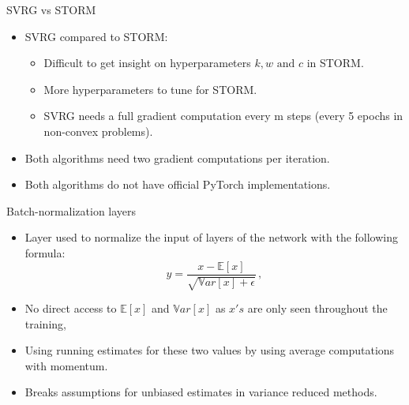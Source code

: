 \documentclass[10pt]{beamer}
\newcommand\pro{\item[\textbf{+}]}
\newcommand\con{\item[\textbf{--\kern 1.2pt}]}
\begin{document}
\begin{frame}{SVRG vs STORM}
    \begin{itemize}
        \item SVRG compared to STORM:
            \begin{itemize}
                \pro Difficult to get insight on hyperparameters $k,w \text{ and } c$ in STORM.
                \pro More hyperparameters to tune for STORM.
                \con SVRG needs a full gradient computation every m steps (every 5 epochs in non-convex problems).
            \end{itemize}
        \item Both algorithms need two gradient computations per iteration.
        \item Both algorithms do not have official PyTorch implementations.
    \end{itemize}
\end{frame}

\begin{frame}{Batch-normalization layers~\citep{ioffe2015batch}}
    \begin{itemize}
        \item Layer used to normalize the input of layers of the network with the following formula:
        \begin{equation}\label{eq:BN}\nonumber
            y = \frac{x-\mathbb{E}[x]}{\sqrt{\mathbb{V}ar[x]+\epsilon}}\,,
        \end{equation}
        \item No direct access to $\mathbb{E}[x]$ and $\mathbb{V}ar[x]$ as $x's$ are only seen throughout the training,
        \item Using running estimates for these two values by using average computations with momentum. 
        \item Breaks assumptions for unbiased estimates in variance reduced methods.
    \end{itemize}
\end{frame}
\end{document}
